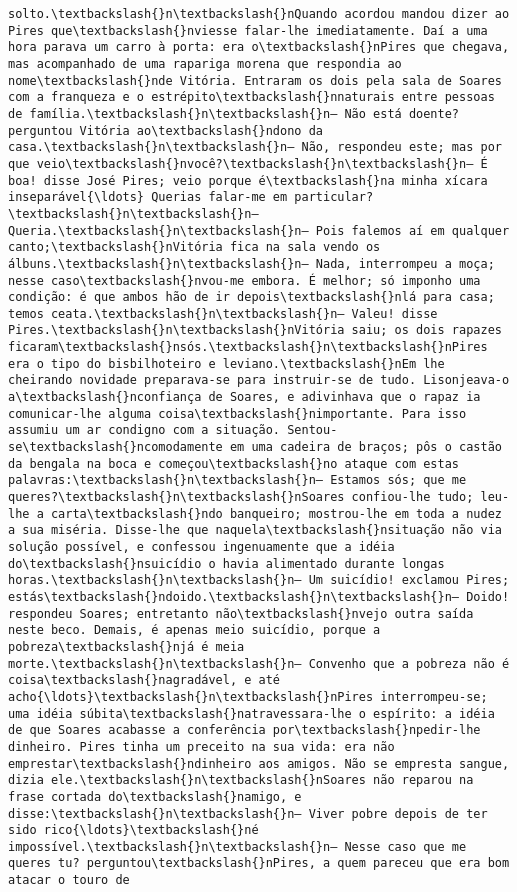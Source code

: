 \documentclass[11pt]{article}
\begin{document}
\begin{Verbatim}[commandchars=\\\{\}]
solto.\textbackslash{}n\textbackslash{}nQuando acordou mandou dizer ao Pires que\textbackslash{}nviesse falar-lhe imediatamente. Daí a uma hora parava um carro à porta: era o\textbackslash{}nPires que chegava, mas acompanhado de uma rapariga morena que respondia ao nome\textbackslash{}nde Vitória. Entraram os dois pela sala de Soares com a franqueza e o estrépito\textbackslash{}nnaturais entre pessoas de família.\textbackslash{}n\textbackslash{}n— Não está doente? perguntou Vitória ao\textbackslash{}ndono da casa.\textbackslash{}n\textbackslash{}n— Não, respondeu este; mas por que veio\textbackslash{}nvocê?\textbackslash{}n\textbackslash{}n— É boa! disse José Pires; veio porque é\textbackslash{}na minha xícara inseparável{\ldots} Querias falar-me em particular?\textbackslash{}n\textbackslash{}n— Queria.\textbackslash{}n\textbackslash{}n— Pois falemos aí em qualquer canto;\textbackslash{}nVitória fica na sala vendo os álbuns.\textbackslash{}n\textbackslash{}n— Nada, interrompeu a moça; nesse caso\textbackslash{}nvou-me embora. É melhor; só imponho uma condição: é que ambos hão de ir depois\textbackslash{}nlá para casa; temos ceata.\textbackslash{}n\textbackslash{}n— Valeu! disse Pires.\textbackslash{}n\textbackslash{}nVitória saiu; os dois rapazes ficaram\textbackslash{}nsós.\textbackslash{}n\textbackslash{}nPires era o tipo do bisbilhoteiro e leviano.\textbackslash{}nEm lhe cheirando novidade preparava-se para instruir-se de tudo. Lisonjeava-o a\textbackslash{}nconfiança de Soares, e adivinhava que o rapaz ia comunicar-lhe alguma coisa\textbackslash{}nimportante. Para isso assumiu um ar condigno com a situação. Sentou-se\textbackslash{}ncomodamente em uma cadeira de braços; pôs o castão da bengala na boca e começou\textbackslash{}no ataque com estas palavras:\textbackslash{}n\textbackslash{}n— Estamos sós; que me queres?\textbackslash{}n\textbackslash{}nSoares confiou-lhe tudo; leu-lhe a carta\textbackslash{}ndo banqueiro; mostrou-lhe em toda a nudez a sua miséria. Disse-lhe que naquela\textbackslash{}nsituação não via solução possível, e confessou ingenuamente que a idéia do\textbackslash{}nsuicídio o havia alimentado durante longas horas.\textbackslash{}n\textbackslash{}n— Um suicídio! exclamou Pires; estás\textbackslash{}ndoido.\textbackslash{}n\textbackslash{}n— Doido! respondeu Soares; entretanto não\textbackslash{}nvejo outra saída neste beco. Demais, é apenas meio suicídio, porque a pobreza\textbackslash{}njá é meia morte.\textbackslash{}n\textbackslash{}n— Convenho que a pobreza não é coisa\textbackslash{}nagradável, e até acho{\ldots}\textbackslash{}n\textbackslash{}nPires interrompeu-se; uma idéia súbita\textbackslash{}natravessara-lhe o espírito: a idéia de que Soares acabasse a conferência por\textbackslash{}npedir-lhe dinheiro. Pires tinha um preceito na sua vida: era não emprestar\textbackslash{}ndinheiro aos amigos. Não se empresta sangue, dizia ele.\textbackslash{}n\textbackslash{}nSoares não reparou na frase cortada do\textbackslash{}namigo, e disse:\textbackslash{}n\textbackslash{}n— Viver pobre depois de ter sido rico{\ldots}\textbackslash{}né impossível.\textbackslash{}n\textbackslash{}n— Nesse caso que me queres tu? perguntou\textbackslash{}nPires, a quem pareceu que era bom atacar o touro de 
\end{Verbatim}
\end{document}
